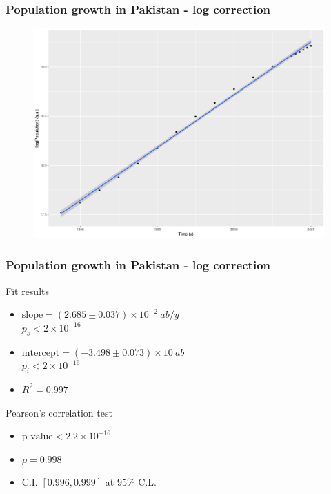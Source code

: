 \documentclass[
	11pt, %
]{beamer}
\begin{document}
\begin{frame}
	\frametitle{Population growth in Pakistan - log correction}
	\begin{figure}
		\includegraphics[width=.75\textwidth]{pak_log.png}
	\end{figure}
\end{frame}

\begin{frame}
	\frametitle{Population growth in Pakistan - log correction}
	\begin{exampleblock}{Fit results}
		\begin{itemize}
			\item $\text{slope} = \left(2.685 \pm 0.037\right) \times 10^{-2} \ ab/y$ \\
				$p_s < 2 \times 10^{-16}$
			\item $\text{intercept} = \left(-3.498 \pm 0.073\right) \times 10 \ ab$ \\
				$p_i < 2 \times 10^{-16}$
			\item $R^2 = 0.997$
		\end{itemize}
	\end{exampleblock}
	\begin{block}{Pearson's correlation test}
		\begin{itemize}
			\item $\text{p-value} < 2.2 \times 10^{-16}$
			\item $\rho = 0.998$
			\item C.I. $\left[0.996, 0.999\right]$ at $95\%$ C.L.
		\end{itemize}
	\end{block}
\end{frame}
\end{document}

